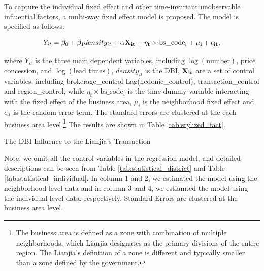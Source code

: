 \documentclass[11pt]{article}
\begin{document}
To capture the individual fixed effect and other time-invariant unobservable influential factors, a multi-way fixed effect model is proposed. The model is specified as follows: 

\begin{equation}
  Y_{it} = \beta_0 + \beta_1 density_{it} + \bf{\alpha} \bf{X}_{it} + \eta_{t} \times \text{bs\_code}_i + \mu_i + \epsilon_{it}, \label{eq:multi-way-fe}
\end{equation}

where $Y_{it}$ is the three main dependent variables, including $\log(\text{number})$, price concession, and $\log(\text{lead times})$, $density_{it}$ is the DBI, $\bf{X}_{it}$ are a set of control variables, including brokerage\_control Lag(hedonic\_control), transaction\_control and region\_control, while $\eta_{t} \times \text{bs\_code}_i$ is the time dummy variable interacting with the fixed effect of the business area, $\mu_i$ is the neighborhood fixed effect and $\epsilon_{it}$ is the random error term. The standard errors are clustered at the each business area level.\footnote{The business area is defined as a zone with combination of multiple neighborhoods, which Lianjia designates as the primary divisions of the entire region. The Lianjia's definition of a zone is different and typically smaller than a zone defined by the government.} The results are shown in Table \ref{tab:stylized_fact}.

\begin{table}[htb!]
    \centering
    \begin{scriptsize}
    
    \caption{The DBI Influence to the Lianjia's Transaction}

    Note: we omit all the control variables in the regression model, and detailed descriptions can be seen from Table \ref{tab:statistical_district} and Table \ref{tab:statistical_individual}. In column 1 and 2, we estimated the model using the neighborhood-level data and in column 3 and 4, we estiamted the model using the individual-level data, respectively. Standard Errors are clustered at the business area level.
    \label{tab:stylized_fact}
    \end{scriptsize}
\end{table}
\end{document}
